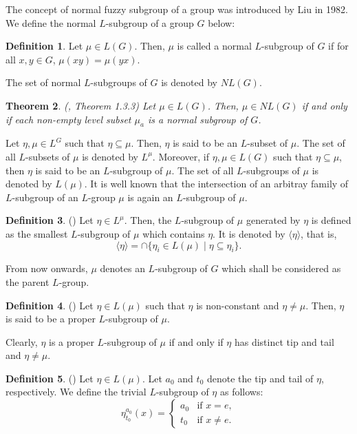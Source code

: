 \documentclass[10pt]{article}
\theoremstyle{plain}
\newtheorem{theorem}{Theorem}[section]
\theoremstyle{definition}
\newtheorem{definition}[theorem]{Definition}
\theoremstyle{remark}
\theoremstyle{case}
\begin{document}
The concept of normal fuzzy subgroup of a group was introduced by Liu \cite{liu_inv} in 1982. We define the normal $L$-subgroup of a group $G$ below:  

\begin{definition}
	Let $\mu\in L(G)$. Then, $\mu $ is called a normal $L$-subgroup of $G$ if for all $x, y \in  G$, $\mu ( xy ) = \mu ( yx )$.
\end{definition}

\noindent The set of normal $L$-subgroups of $G$ is denoted by $NL(G)$. 

\begin{theorem}(\cite{mordeson_comm}, Theorem 1.3.3)
	\label{lev_norgp}
	Let $\mu \in L{(G)}$. Then, $\mu \in NL(G)$ if and only if each non-empty level subset $\mu_a$ is a normal subgroup of $G$.	
\end{theorem}

Let $\eta, \mu\in L^{{G}}$ such that $\eta\subseteq\mu$. Then, $\eta$ is said to be an $L$-subset of $\mu$. The set of all $L$-subsets of $\mu$ is denoted by $L^{\mu}.$
Moreover, if $\eta,\mu\in L(G)$ such that  $\eta\subseteq \mu$, then $\eta$ is said to be an $L$-subgroup of $\mu$. The set of all $L$-subgroups of $\mu$ is denoted by $L(\mu)$. It is well known that the intersection of an arbitray family of $L$-subgroup of an $L$-group $\mu$ is again an $L$-subgroup of $\mu$.
 \begin{definition}(\cite{ajmal_char})
 	Let $\eta \in L ^{\mu}$.  Then, the $L$-subgroup of $\mu$ generated by $\eta $ is defined as the smallest $L$-subgroup of $\mu$
 	which contains $\eta $. It is denoted by $\langle \eta \rangle $, that is,
 	\[
 	\langle \eta \rangle =\cap\{\eta _{{i}} \in L(\mu) \mid \eta \subseteq \eta _{i}\}.
 	\]
 \end{definition}

From now onwards, $\mu$ denotes an $L$-subgroup of $G$ which shall be considered as the parent $L$-group. 

\begin{definition}(\cite{ajmal_sol}) 
	Let $\eta\in L(\mu)$ such that $\eta$ is non-constant and $\eta\ne\mu$. Then, $\eta$ is said to be a proper $L$-subgroup of $\mu$.
\end{definition}

\noindent Clearly, $\eta$ is a proper $L$-subgroup of $\mu$ if and only if $\eta$ has distinct tip and tail and $\eta\ne\mu$.

\begin{definition}(\cite{ajmal_nil})
	Let $\eta \in L(\mu)$. Let $a_0$ and $t_0$ denote the tip and tail of $\eta$, respectively. We define the trivial $L$-subgroup of $\eta$ as follows:
	\[ \eta_{t_0}^{a_0}(x) = \begin{cases}
		a_0 & \text{if } x=e,\\
		t_0 & \text{if } x \neq e.
	\end{cases} \]
\end{definition}
\end{document}
